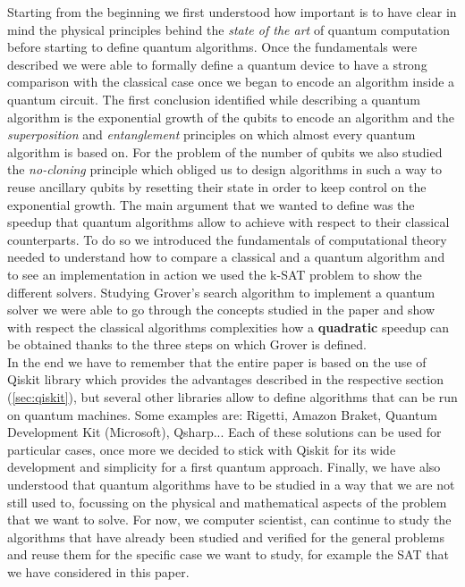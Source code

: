 \documentclass[english]{article}
\begin{document}
		Starting from the beginning we first understood how important is to have clear in mind the physical principles behind the \emph{state of the art} of quantum computation before starting to define quantum algorithms. Once the fundamentals were described we were able to formally define a quantum device to have a strong comparison with the classical case once we began to encode an algorithm inside a quantum circuit. The first conclusion identified while describing a quantum algorithm is the exponential growth of the qubits to encode an algorithm and the \emph{superposition} and \emph{entanglement} principles on which almost every quantum algorithm is based on. For the problem of the number of qubits we also studied the \emph{no-cloning} principle which obliged us to design algorithms in such a way to reuse ancillary qubits by resetting their state in order to keep control on the exponential growth. The main argument that we wanted to define was the speedup that quantum algorithms allow to achieve with respect to their classical counterparts. To do so we introduced the fundamentals of computational theory needed to understand how to compare a classical and a quantum algorithm and to see an implementation in action we used the k-SAT problem to show the different solvers. Studying Grover's search algorithm to implement a quantum solver we were able to go through the concepts studied in the paper and show with respect the classical algorithms complexities how a \textbf{quadratic} speedup can be obtained thanks to the three steps on which Grover is defined. \\
		
		In the end we have to remember that the entire paper is based on the use of Qiskit library which provides the advantages described in the respective section (\ref{sec:qiskit}), but several other libraries allow to define algorithms that can be run on quantum machines. Some examples are: Rigetti, Amazon Braket, Quantum Development Kit (Microsoft), Qsharp... Each of these solutions can be used for particular cases, once more we decided to stick with Qiskit for its wide development and simplicity for a first quantum approach. Finally, we have also understood that quantum algorithms have to be studied in a way that we are not still used to, focussing on the physical and mathematical aspects of the problem that we want to solve. For now, we computer scientist, can continue to study the algorithms that have already been studied and verified for the general problems and reuse them for the specific case we want to study, for example the SAT that we have considered in this paper. 
		
\end{document}
